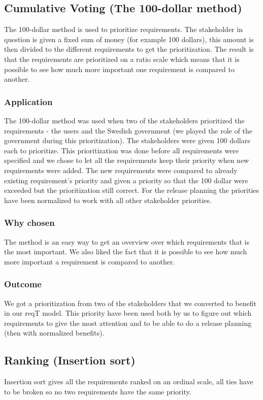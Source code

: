 \documentclass[a4paper]{article}
\begin{document}
	\subsection{Cumulative Voting (The 100-dollar method)}
		The 100-dollar method is used to prioritize requirements. The stakeholder in question is given a fixed sum of money (for example 100 dollars), this amount is then divided to the different requirements to get the prioritization. The result is that the requirements are prioritized on a ratio scale which means that it is possible to see how much more important one requirement is compared to another.   
		\subsubsection{Application}
			The 100-dollar method was used when two of the stakeholders prioritized the requirements - the users and the Swedish government (we played the role of the government during this prioritization). The stakeholders were given 100 dollars each to prioritize. This prioritization was done before all requirements were specified and we chose to let all the requirements keep their priority when new requirements were added. The new requirements were compared to already existing requirement's priority and given a priority so that the 100 dollar were exceeded but the prioritization still correct. For the release planning the priorities have been normalized to work with all other stakeholder priorities. 
		\subsubsection{Why chosen}
			The method is an easy way to get an overview over which requirements that is the most important. We also liked the fact that it is possible to see how much more important a requirement is compared to another.
		\subsubsection{Outcome}
			We got a prioritization from two of the stakeholders that we converted to benefit in our reqT model. This priority have been used both by us to figure out which requirements to give the most attention and to be able to do a release planning (then with normalized benefits).

	\subsection{Ranking (Insertion sort)}
		Insertion sort gives all the requirements ranked on an ordinal scale, all ties have to be broken so no two requirements have the same priority.
\end{document}

